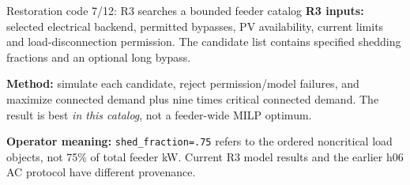 \begin{frame}[t]{Restoration code 7/12: R3 searches a bounded feeder catalog}
\deepdive
{}
\footnotesize
\textbf{R3 inputs:} selected electrical backend, permitted bypasses, PV availability, current limits and load-disconnection permission. The candidate list contains specified shedding fractions and an optional long bypass.
\par\smallskip\textbf{Method:} simulate each candidate, reject permission/model failures, and maximize connected demand plus nine times critical connected demand. The result is best \emph{in this catalog}, not a feeder-wide MILP optimum.
\par\smallskip\textbf{Operator meaning:} \texttt{shed\_fraction=.75} refers to the ordered noncritical load objects, not 75\% of total feeder kW. Current R3 model results and the earlier h06 AC protocol have different provenance.
\end{frame}

